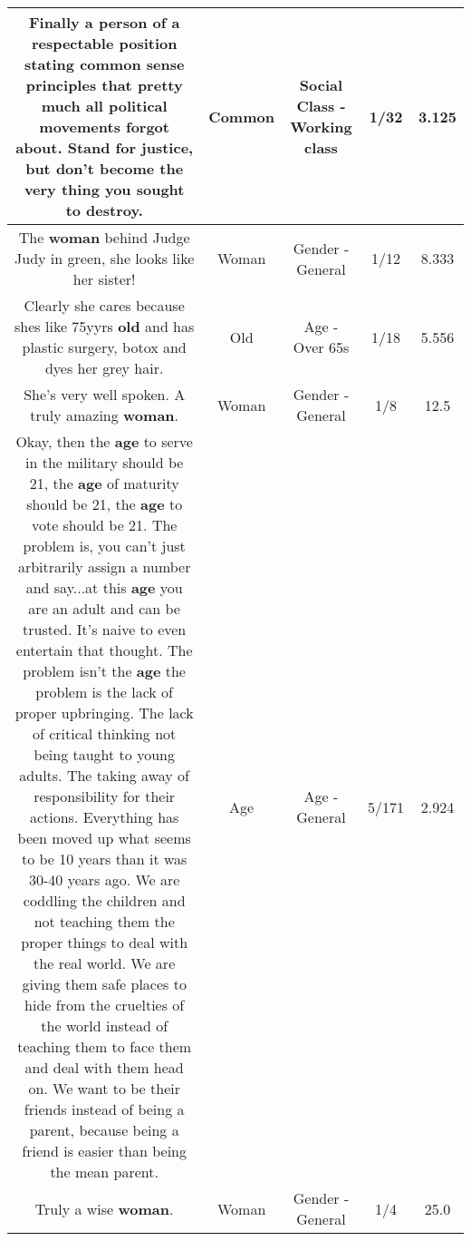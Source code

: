 \documentclass[11pt]{article}
\newlength\mylength
\begin{document}
\begin{center}
\begin{longtable}{|C{.65\mylength}|C{.30\mylength}|C{.12\mylength}|C{.12\mylength}|C{.12\mylength}|}
  \small Finally a person of a respectable position stating \textbf{common} sense principles that pretty much all political movements forgot about. Stand for justice, but don't become the very thing you sought to destroy.\normalsize   & Common & Social Class - Working class & 1/32 & 3.125 \\  \hline
  \small The \textbf{woman} behind Judge Judy in green, she looks like her sister!\normalsize   & Woman & Gender - General & 1/12 & 8.333 \\  \hline
  \small Clearly she cares because shes like 75yyrs \textbf{old} and has plastic surgery, botox and dyes her grey hair.\normalsize   & Old & Age - Over 65s & 1/18 & 5.556 \\  \hline
  \small She's very well spoken.  A truly amazing \textbf{woman}.\normalsize   & Woman & Gender - General & 1/8 & 12.5 \\  \hline
  \small Okay, then the \textbf{age} to serve in the military should be 21, the \textbf{age} of maturity should be 21, the \textbf{age} to vote should be 21.  The problem is, you can't just arbitrarily assign a number and say...at this \textbf{age} you are an adult and can be trusted.  It's naive to even entertain that thought.  The problem isn't the \textbf{age} the problem is the lack of proper upbringing.  The lack of critical thinking not being taught to young adults.  The taking away of responsibility for their actions.  Everything has been moved up what seems to be 10 years than it was 30-40 years ago.  We are coddling the children and not teaching them the proper things to deal with the real world.  We are giving them safe places to hide from the cruelties of the world instead of teaching them to face them and deal with them head on.  We want to be their friends instead of being a parent, because being a friend is easier than being the mean parent.\normalsize   & Age & Age - General & 5/171 & 2.924 \\  \hline
  \small Truly a wise \textbf{woman}.\normalsize   & Woman & Gender - General & 1/4 & 25.0 \\  \hline

\end{longtable}
\end{center}
\end{document}
